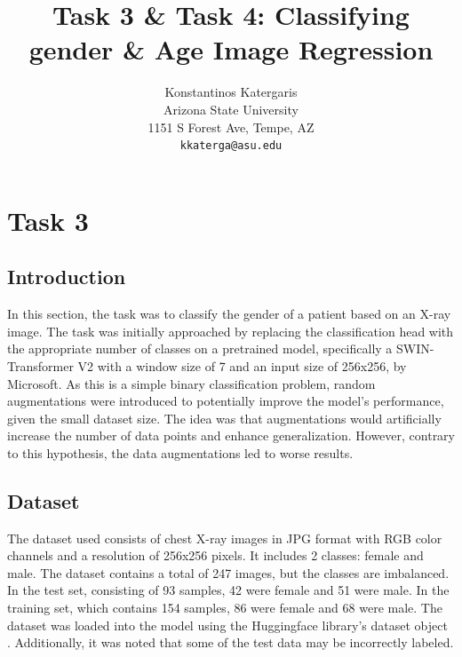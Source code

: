 \documentclass[10pt,twocolumn,letterpaper]{article}
\begin{document}
\title{Task 3 \& Task 4: Classifying gender & Age Image Regression }

\author{Konstantinos Katergaris\\
Arizona State University\\
1151 S Forest Ave, Tempe, AZ\\
{\tt\small kkaterga@asu.edu}}


\maketitle

\section{Task 3}

\subsection{Introduction}
In this section, the task was to classify the gender of a patient based on an X-ray image. The task was initially approached by replacing the classification head with the appropriate number of classes on a pretrained model, specifically a SWIN-Transformer V2 with a window size of 7 and an input size of 256x256, by Microsoft. As this is a simple binary classification problem, random augmentations were introduced to potentially improve the model's performance, given the small dataset size. The idea was that augmentations would artificially increase the number of data points and enhance generalization. However, contrary to this hypothesis, the data augmentations led to worse results.
\subsection{Dataset}
The dataset used \cite{DatasetForClass} consists of chest X-ray images in JPG format with RGB color channels and a resolution of 256x256 pixels. It includes 2 classes: female and male. The dataset contains a total of 247 images, but the classes are imbalanced. In the test set, consisting of 93 samples, 42 were female and 51 were male. In the training set, which contains 154 samples, 86 were female and 68 were male. The dataset was loaded into the model using the Huggingface library's dataset object \cite{huggingfacedataset}. Additionally, it was noted that some of the test data may be incorrectly labeled.
\end{document}
